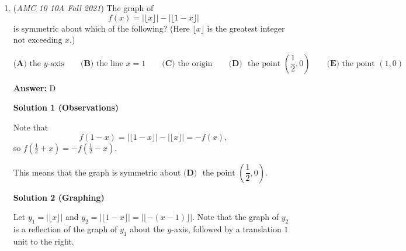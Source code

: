 \begin{enumerate}
 The radii of the circumcenters of $\triangle ABO_2$ and $\triangle ABO_2$ must be equal, as the two triangles are congruent. We recall that the midpoint of the hypotenuse of a right triangle is it's circumcenter, so $\overline{BO_1}$ and $\overline{CO_2}$ - as the radii of the circumcircles of their respective triangles - must be congruent. Furthermore, we have $\overline{BO_1} \cong \overline{AO_1}$ and $\overline{CO_1} \cong \overline{AO_1}$, from the same fact, so $\overline{BO_1} \cong \overline{AO_1} \cong \overline{CO_1}$. Thus, $O_1$ is the circumcenter of $\triangle ABC$. 

 By the Pythagorean Theorem, $\overline{AO_2} = \sqrt{ (3\sqrt{6})^2 + (5\sqrt{2})^2 } = 2\sqrt{26}$, so $\overline{AO_1}$, the radius of the circle through points $A$, $B$, and $C$ is $\sqrt{26}$, and thus the area of the circle is $\boxed{ (C) \ 26\pi }$.

 


	\item (\textit{AMC 10 10A Fall 2021}) The graph of 
 \[f(x) = |\lfloor x \rfloor| - |\lfloor 1 - x \rfloor|\] is symmetric about which of the following? (Here $\lfloor x \rfloor$ is the greatest integer not exceeding $x$.)


 \(\textbf{(A) }\text{the }y\text{-axis}\qquad \textbf{(B) }\text{the line }x = 1\qquad \textbf{(C) }\text{the origin}\qquad
\textbf{(D) }\text{ the point }\left(\dfrac12, 0\right)\qquad \textbf{(E) }\text{the point }(1,0)\)


 
 \textbf{Answer: }D



\textbf{Solution 1 (Observations)}

Note that 
 \[f(1-x)=|\lfloor 1-x\rfloor|-|\lfloor x\rfloor|=-f(x),\]so $f\left(\frac12+x\right)=-f\left(\frac12-x\right)$.

 This means that the graph is symmetric about $\boxed{\textbf{(D) }\text{ the point }\left(\dfrac12, 0\right)}$.

 



\textbf{Solution 2 (Graphing)}

Let $y_1=|\lfloor x \rfloor|$ and $y_2=|\lfloor 1 - x \rfloor|=|\lfloor -(x-1) \rfloor|.$ Note that the graph of $y_2$ is a reflection of the graph of $y_1$ about the $y$-axis, followed by a translation $1$ unit to the right.


\end{enumerate}
